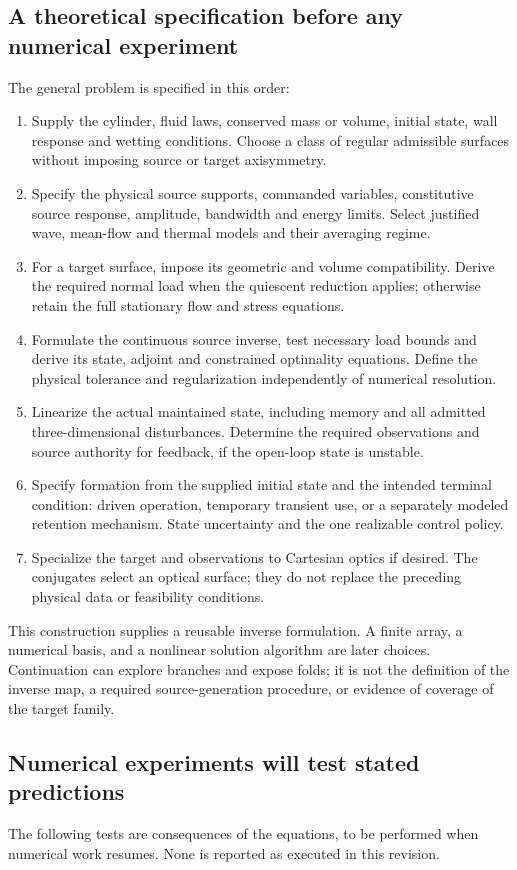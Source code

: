 \subsection{A theoretical specification before any numerical experiment}
The general problem is specified in this order:
\begin{enumerate}
\item Supply the cylinder, fluid laws, conserved mass or volume, initial state,
wall response and wetting conditions. Choose a class of regular admissible
surfaces without imposing source or target axisymmetry.
\item Specify the physical source supports, commanded variables, constitutive
source response, amplitude, bandwidth and energy limits. Select justified
wave, mean-flow and thermal models and their averaging regime.
\item For a target surface, impose its geometric and volume compatibility.
Derive the required normal load when the quiescent reduction applies;
otherwise retain the full stationary flow and stress equations.
\item Formulate the continuous source inverse, test necessary load bounds and
derive its state, adjoint and constrained optimality equations. Define the
physical tolerance and regularization independently of numerical resolution.
\item Linearize the actual maintained state, including memory and all admitted
three-dimensional disturbances. Determine the required observations and source
authority for feedback, if the open-loop state is unstable.
\item Specify formation from the supplied initial state and the intended terminal
condition: driven operation, temporary transient use, or a separately modeled
retention mechanism. State uncertainty and the one realizable control policy.
\item Specialize the target and observations to Cartesian optics if desired.
The conjugates select an optical surface; they do not replace the preceding
physical data or feasibility conditions.
\end{enumerate}
This construction supplies a reusable inverse formulation. A finite array,
a numerical basis, and a nonlinear solution algorithm are later choices.
Continuation can explore branches and expose folds; it is not the definition
of the inverse map, a required source-generation procedure, or evidence of
coverage of the target family.

\subsection{Numerical experiments will test stated predictions}
The following tests are consequences of the equations, to be performed when
numerical work resumes. None is reported as executed in this revision.

